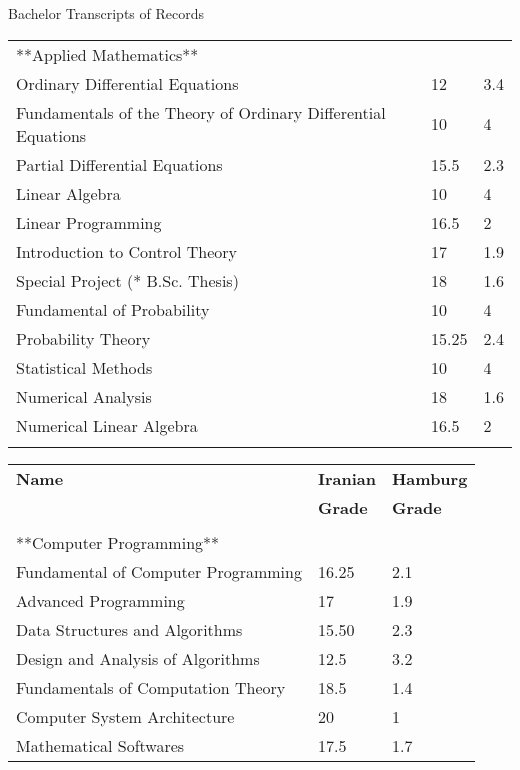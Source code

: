 \documentclass{resume} %
\begin{document}
\begin{cSection}{Bachelor Transcripts of Records}
\begin{tabular}{ @{} l l l}
	**Applied Mathematics**&&\\
	Ordinary Differential Equations & 12 & 3.4 \\ %
	Fundamentals of the Theory of Ordinary Differential Equations & 10 & 4\\ %
	Partial Differential Equations & 15.5 & 2.3 \\ %
	Linear Algebra & 10 & 4\\ %
	
	Linear Programming & 16.5 & 2\\ %
	Introduction to Control Theory & 17 & 1.9 \\ %
	
	Special Project (* B.Sc. Thesis) & 18 & 1.6\\ %
	
	Fundamental of Probability & 10 & 4\\ %
	Probability Theory & 15.25 & 2.4 \\ %
	Statistical Methods & 10 & 4 \\ %
	
	Numerical Analysis & 18 & 1.6 \\ %
	Numerical Linear Algebra & 16.5 & 2 \\ %
	\cline{1-3}\\
	
	\end{tabular}
	\begin{tabular}{ @{} l @{\hspace*{18ex}}>{}l l}
	\textbf{Name} & \textbf{Iranian} & \textbf{Hamburg}\\
	 & \textbf{Grade} & \textbf{Grade}
		\\\cline{1-3}\\
		**Computer Programming**&&\\
		Fundamental of Computer Programming & 16.25 & 2.1\\ %
		Advanced Programming & 17 & 1.9 \\ %
		Data Structures and Algorithms & 15.50 & 2.3 \\ %
		Design and Analysis of Algorithms & 12.5 & 3.2 \\ %
		
		Fundamentals of Computation Theory & 18.5 & 1.4\\ %
		
		Computer System Architecture & 20 & 1 \\ %
		Mathematical Softwares & 17.5 & 1.7 \\ %
	\end{tabular}
\end{cSection}
\end{document}
